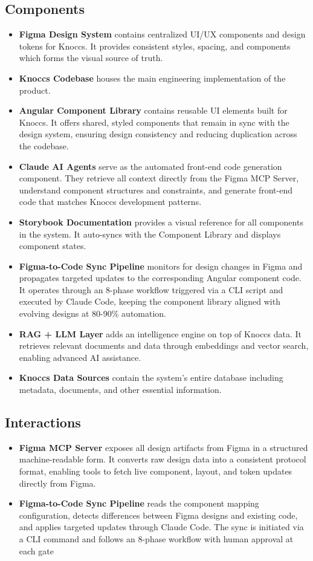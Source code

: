 \subsection{Components}
\begin{itemize}
    \item \textbf{Figma Design System} contains centralized UI/UX components and design tokens for Knoccs. It provides consistent styles, spacing, and components which forms the visual source of truth.
    \item \textbf{Knoccs Codebase} houses the main engineering implementation of the product.
    \item \textbf{Angular Component Library} contains reusable UI elements built for Knoccs. It offers shared, styled components that remain in sync with the design system, ensuring design consistency and reducing duplication across the codebase.
    \item \textbf{Claude AI Agents} serve as the automated front-end code generation component. They retrieve all context directly from the Figma MCP Server, understand component structures and constraints, and generate front-end code that matches Knoccs development patterns.
    \item \textbf{Storybook Documentation} provides a visual reference for all components in the system. It auto-syncs with the Component Library and displays component states.
    \item \textbf{Figma-to-Code Sync Pipeline} monitors for design changes in Figma and propagates targeted updates to the corresponding Angular component code. It operates through an 8-phase workflow triggered via a CLI script and executed by Claude Code, keeping the component library aligned with evolving designs at 80-90\% automation.
    \item \textbf{RAG + LLM Layer} adds an intelligence engine on top of Knoccs data. It retrieves relevant documents and data through embeddings and vector search, enabling advanced AI assistance.
    \item \textbf{Knoccs Data Sources} contain the system's entire database including metadata, documents, and other essential information.
\end{itemize}

\subsection{Interactions}
\begin{itemize}
    \item \textbf{Figma MCP Server} exposes all design artifacts from Figma in a structured machine-readable form. It converts raw design data into a consistent protocol format, enabling tools to fetch live component, layout, and token updates directly from Figma.
    \item \textbf{Figma-to-Code Sync Pipeline} reads the component mapping configuration, detects differences between Figma designs and existing code, and applies targeted updates through Claude Code. The sync is initiated via a CLI command and follows an 8-phase workflow with human approval at each gate
\end{itemize}

